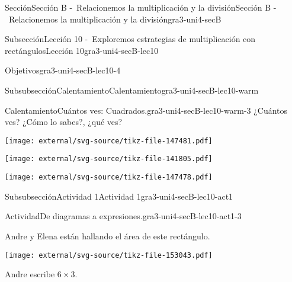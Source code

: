 \documentclass[twoside,14pt,]{extarticle}
\begin{document}
\begin{sectionptx}{Sección}{Sección B -~Relacionemos la multiplicación y la división}{}{Sección B -~Relacionemos la multiplicación y la división}{}{}{gra3-uni4-secB}
\begin{subsectionptx}{Subsección}{Lección 10 -~Exploremos estrategias de multiplicación con rectángulos}{}{Lección 10}{}{}{gra3-uni4-secB-lec10}
\begin{objectives}{Objetivos}{gra3-uni4-secB-lec10-4}
\begin{itemize}[label=\textbullet]
\end{itemize}
\end{objectives}
%
%
\typeout{************************************************}
\typeout{************************************************}
%
\begin{subsubsectionptx}{Subsubsección}{Calentamiento}{}{Calentamiento}{}{}{gra3-uni4-secB-lec10-warm}
\begin{exploration}{Calentamiento}{Cuántos ves: Cuadrados.}{gra3-uni4-secB-lec10-warm-3}%
¿Cuántos ves? ¿Cómo lo sabes?, ¿qué ves?%
\begin{image}{0}{1}{0}{}%
\texttt{[image: external/svg-source/tikz-file-147481.pdf]}
\end{image}%
\begin{image}{0}{1}{0}{}%
\texttt{[image: external/svg-source/tikz-file-141805.pdf]}
\end{image}%
\begin{image}{0}{1}{0}{}%
\texttt{[image: external/svg-source/tikz-file-147478.pdf]}
\end{image}%
\end{exploration}%
\end{subsubsectionptx}
%
%
\typeout{************************************************}
\typeout{************************************************}
%
\begin{subsubsectionptx}{Subsubsección}{Actividad 1}{}{Actividad 1}{}{}{gra3-uni4-secB-lec10-act1}
\begin{activity}{Actividad}{De diagramas a expresiones.}{gra3-uni4-secB-lec10-act1-3}%
\begin{sidebyside}{2}{0.025}{0.025}{0.05}%
\begin{sbspanel}{0.4}%
Andre y Elena están hallando el área de este rectángulo.%
\end{sbspanel}%
\begin{sbspanel}{0.5}%
\texttt{[image: external/svg-source/tikz-file-153043.pdf]}
\end{sbspanel}%
\end{sidebyside}%
\begin{sidebyside}{3}{0}{0}{0.065}%
\begin{sbspanel}{0.27}%
Andre escribe \(6\times 3\).%
\end{sbspanel}%
\begin{sbspanel}{0.35}%

\end{sbspanel}
\end{sidebyside}
\end{activity}
\end{subsubsectionptx}
\end{subsectionptx}
\end{sectionptx}
\end{document}
